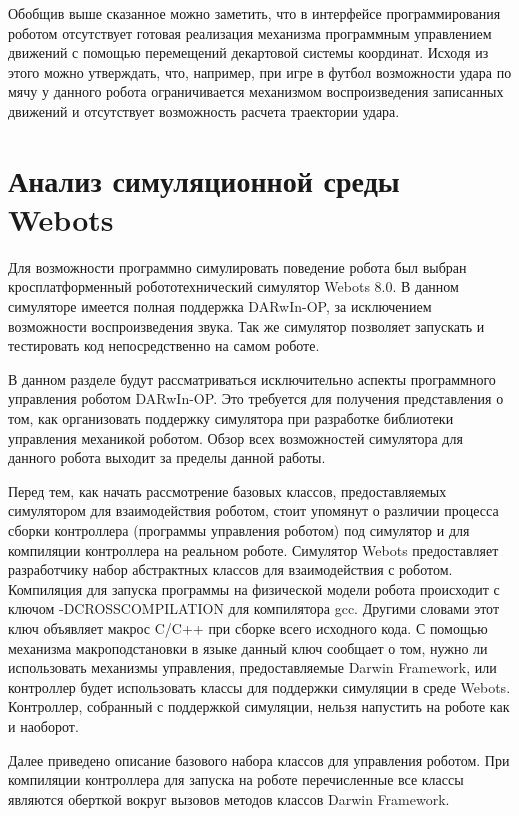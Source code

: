Обобщив выше сказанное можно заметить, что в интерфейсе программирования роботом отсутствует готовая реализация механизма программным управлением движений с помощью перемещений декартовой системы координат. Исходя из этого можно утверждать, что, например, при игре в футбол возможности удара по мячу у данного робота ограничивается механизмом воспроизведения записанных движений и отсутствует возможность расчета траектории удара. 

\section{Анализ симуляционной среды Webots}

Для возможности программно симулировать поведение робота был выбран кросплатформенный робототехнический симулятор Webots 8.0. В данном симуляторе имеется полная поддержка DARwIn-OP, за исключением возможности воспроизведения звука. Так же симулятор позволяет запускать и тестировать код непосредственно на самом роботе.

В данном разделе будут рассматриваться исключительно аспекты программного управления роботом DARwIn-OP. Это требуется для получения представления о том, как организовать поддержку симулятора при разработке библиотеки управления механикой роботом. Обзор всех возможностей симулятора для данного робота выходит за пределы данной работы.

Перед тем, как начать рассмотрение базовых классов, предоставляемых симулятором для взаимодействия роботом, стоит упомянут о различии процесса сборки контроллера (программы управления роботом) под симулятор и для компиляции контроллера на реальном роботе. Симулятор Webots предоставляет разработчику набор абстрактных классов для взаимодействия с роботом. Компиляция для запуска программы на физической модели робота происходит с ключом -DCROSSCOMPILATION для компилятора gcc. Другими словами этот ключ объявляет макрос C/C++ при сборке всего исходного кода. С помощью механизма макроподстановки в языке данный ключ сообщает о том, нужно ли использовать механизмы управления, предоставляемые Darwin Framework, или контроллер будет использовать классы для поддержки симуляции в среде Webots. Контроллер, собранный с поддержкой симуляции, нельзя напустить на роботе как и наоборот.

Далее приведено описание базового набора классов для управления роботом. При компиляции контроллера для запуска на роботе перечисленные все классы являются оберткой вокруг вызовов методов классов Darwin Framework.


